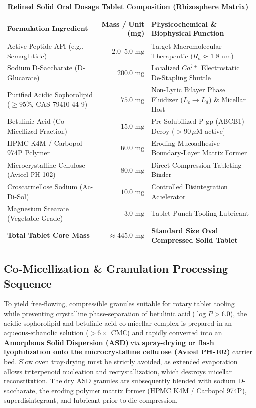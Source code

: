 \documentclass[10pt,twocolumn,letterpaper]{article}
\begin{document}
\begin{table}[t!]
\centering
\small
\caption{\textbf{Refined Solid Oral Dosage Tablet Composition (Rhizosphere Matrix)}}
\vspace{0.15cm}
\begin{tabularx}{0.92\textwidth}{|l|r|X|}
\hline
\rowcolor{tableheader}
\textbf{Formulation Ingredient} & \textbf{Mass / Unit (mg)} & \textbf{Physicochemical \& Biophysical Function} \\
\hline
Active Peptide API (e.g., Semaglutide) & $2.0\text{--}5.0\text{ mg}$ & Target Macromolecular Therapeutic ($R_h \approx 1.8\text{ nm}$) \\
\hline
Sodium D-Saccharate (D-Glucarate) & $200.0\text{ mg}$ & Localized $Ca^{2+}$ Electrostatic De-Stapling Shuttle \\
\hline
Purified Acidic Sophorolipid ($\ge 95\%$, CAS 79410-44-9) & $75.0\text{ mg}$ & Non-Lytic Bilayer Phase Fluidizer ($L_o \rightarrow L_d$) \& Micellar Host \\
\hline
Betulinic Acid (Co-Micellized Fraction) & $15.0\text{ mg}$ & Pre-Solubilized P-gp (ABCB1) Decoy ($>90\ \mu\text{M}$ active) \\
\hline
HPMC K4M / Carbopol 974P Polymer & $60.0\text{ mg}$ & Eroding Mucoadhesive Boundary-Layer Matrix Former \\
\hline
Microcrystalline Cellulose (Avicel PH-102) & $80.0\text{ mg}$ & Direct Compression Tableting Binder \\
\hline
Croscarmellose Sodium (Ac-Di-Sol) & $10.0\text{ mg}$ & Controlled Disintegration Accelerator \\
\hline
Magnesium Stearate (Vegetable Grade) & $3.0\text{ mg}$ & Tablet Punch Tooling Lubricant \\
\hline\hline
\textbf{Total Tablet Core Mass} & \textbf{$\approx 445.0\text{ mg}$} & \textbf{Standard Size Oval Compressed Solid Tablet} \\
\hline
\end{tabularx}
\end{table}

\subsection{Co-Micellization \& Granulation Processing Sequence}
To yield free-flowing, compressible granules suitable for rotary tablet tooling while preventing crystalline phase-separation of betulinic acid ($\log P > 6.0$), the acidic sophorolipid and betulinic acid co-micellar complex is prepared in an aqueous-ethanolic solution ($>6\times\text{ CMC}$) and rapidly converted into an \textbf{Amorphous Solid Dispersion (ASD)} via \textbf{spray-drying or flash lyophilization onto the microcrystalline cellulose (Avicel PH-102)} carrier bed. Slow oven tray-drying must be strictly avoided, as extended evaporation allows triterpenoid nucleation and recrystallization, which destroys micellar reconstitution. The dry ASD granules are subsequently blended with sodium D-saccharate, the eroding polymer matrix former (HPMC K4M / Carbopol 974P), superdisintegrant, and lubricant prior to die compression.
\end{document}

